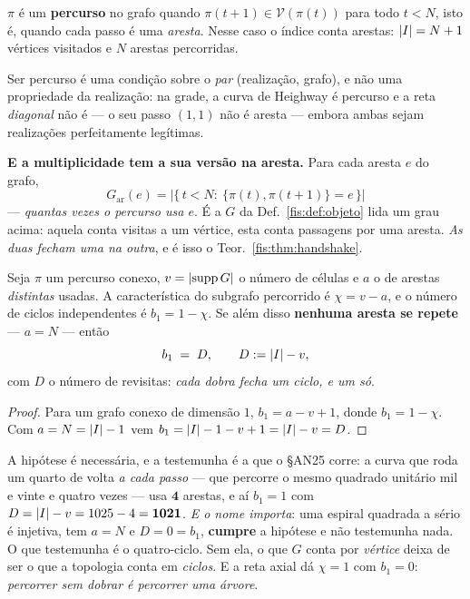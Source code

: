 \documentclass[livro.tex]{subfiles}
\begin{document}
\begin{definicao}[percurso]\label{fis:def:percurso}
$\pi$ é um \textbf{percurso} no grafo quando $\pi(t+1)\in \mathcal{V}(\pi(t))$
para todo $t<N$, isto é, quando cada passo é uma \emph{aresta}. Nesse caso o
índice conta arestas: $\lvert I\rvert=N+1$ vértices visitados e $N$ arestas percorridas.

\medskip\noindent Ser percurso é uma condição sobre o \emph{par} (realização,
grafo), e não uma propriedade da realização: na grade, a curva de Heighway é
percurso e a reta \emph{diagonal} não é --- o seu passo $(1,1)$ não é aresta ---
embora ambas sejam realizações perfeitamente legítimas.

\medskip\noindent\textbf{E a multiplicidade tem a sua versão na aresta.} Para
cada aresta $e$ do grafo,
\[
\boxed{\;G_{\mathrm{ar}}(e)=\bigl\lvert\{\,t<N:\ \{\pi(t),\pi(t{+}1)\}=e\,\}\bigr\rvert\;}
\]
--- \emph{quantas vezes o percurso usa $e$}. É a $G$ da Def.~\ref{fis:def:objeto}
lida um grau acima: aquela conta visitas a um vértice, esta conta passagens por
uma aresta. \emph{As duas fecham uma na outra}, e é isso o
Teor.~\ref{fis:thm:handshake}.
\end{definicao}

\begin{teorema}\label{fis:thm:euler}
Seja $\pi$ um percurso conexo, $v=\lvert \operatorname{supp}G\rvert$ o número de células
e $a$ o de arestas \emph{distintas} usadas. A característica do subgrafo
percorrido é $\chi=v-a$, e o número de ciclos independentes é $b_1=1-\chi$. Se
além disso \textbf{nenhuma aresta se repete} --- $a=N$ --- então
\[
b_1\;=\;D,\qquad D:=\lvert I\rvert-v ,
\]
com $D$ o número de revisitas: \emph{cada dobra fecha um ciclo, e um só}.
\end{teorema}

\begin{proof}
Para um grafo conexo de dimensão $1$, $b_1=a-v+1$, donde $b_1=1-\chi$. Com
$a=N=\lvert I\rvert-1$ vem $b_1=\lvert I\rvert-1-v+1=\lvert I\rvert-v=D$.
\end{proof}

\medskip\noindent A hipótese é necessária, e a testemunha é a que o §AN25 corre:
a curva que roda um quarto de volta \emph{a cada passo} --- que percorre o mesmo
quadrado unitário mil e vinte e quatro vezes --- usa $\mathbf{4}$ arestas, e aí
$b_1=1$ com $D=\lvert I\rvert-v=1025-4=\mathbf{1021}$. \emph{E o nome importa}: uma
espiral quadrada a sério é injetiva, tem $a=N$ e $D=0=b_1$, \textbf{cumpre} a
hipótese e não testemunha nada. O que testemunha é o quatro-ciclo.
Sem ela, o que $G$ conta por \emph{vértice} deixa de ser o que a topologia conta
em \emph{ciclos}. E a reta axial dá $\chi=1$ com $b_1=0$: \emph{percorrer sem
dobrar é percorrer uma árvore}.
\end{document}
